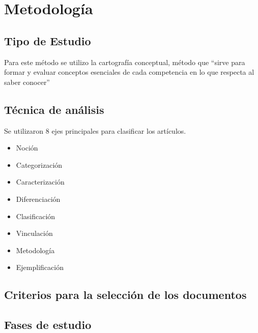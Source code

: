 \section{Metodología}
\subsection{Tipo de Estudio}
Para este método se utilizo la cartografía conceptual, método que “sirve para formar y evaluar conceptos esenciales de cada competencia en lo que respecta al saber conocer” \parencite[][p. 16]{tobon2012} 
\subsection{Técnica de análisis}
Se utilizaron 8 ejes principales para clasificar los artículos.
\begin{itemize}
   \item Noción
   \item Categorización
   \item Caracterización
   \item Diferenciación
   \item Clasificación
   \item Vinculación
   \item Metodología
   \item Ejemplificación
\end{itemize}
\subsection{Criterios para la selección de los documentos}
\subsection{Fases de estudio}

%
%

